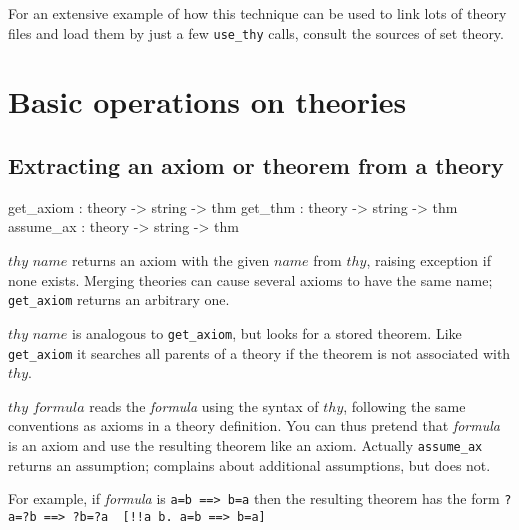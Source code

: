 For an extensive example of how this technique can be used to link lots of
theory files and load them by just a few {\tt use_thy} calls, consult the
sources of \ZF{} set theory.



\section{Basic operations on theories}\label{BasicOperationsOnTheories}
\subsection{Extracting an axiom or theorem from a theory}
\begin{ttbox}
get_axiom : theory -> string -> thm
get_thm   : theory -> string -> thm
assume_ax : theory -> string -> thm
\end{ttbox}
\begin{ttdescription}
\item[\ttindexbold{get_axiom} $thy$ $name$]
  returns an axiom with the given $name$ from $thy$, raising exception
   if none exists.  Merging theories can cause several axioms
  to have the same name; {\tt get_axiom} returns an arbitrary one.

\item[\ttindexbold{get_thm} $thy$ $name$]
  is analogous to {\tt get_axiom}, but looks for a stored theorem. Like
  {\tt get_axiom} it searches all parents of a theory if the theorem
  is not associated with $thy$.

\item[\ttindexbold{assume_ax} $thy$ $formula$]
  reads the {\it formula} using the syntax of $thy$, following the same
  conventions as axioms in a theory definition.  You can thus pretend that
  {\it formula} is an axiom and use the resulting theorem like an axiom.
  Actually {\tt assume_ax} returns an assumption;  
  complains about additional assumptions, but  does not.

For example, if {\it formula} is
\hbox{\tt a=b ==> b=a} then the resulting theorem has the form
\hbox{\verb'?a=?b ==> ?b=?a  [!!a b. a=b ==> b=a]'}
\end{ttdescription}

